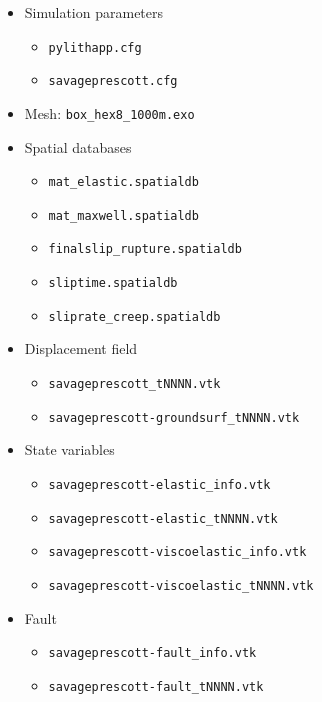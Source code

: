 \documentclass[pdftex,cig,slideColor]{pp4slides}
\begin{document}
{\small
 \hspace*{-0.5in}
  \begin{minipage}[t]{4.5in}
    {}
    \begin{itemize}
    \item Simulation parameters
      \begin{itemize}
      \item {\tt pylithapp.cfg}
      \item {\tt savageprescott.cfg}
      \end{itemize}
    \item Mesh: {\tt box\_hex8\_1000m.exo}
    \item Spatial databases
      \begin{itemize}
      \item {\tt mat\_elastic.spatialdb}
      \item {\tt mat\_maxwell.spatialdb}
      \item {\tt finalslip\_rupture.spatialdb}
      \item {\tt sliptime.spatialdb}
      \item {\tt sliprate\_creep.spatialdb}
      \end{itemize}
    \end{itemize}
  \end{minipage}
  \hfill
  \begin{minipage}[t]{4.75in}
    {}
    \begin{itemize}
   \item Displacement field
      \begin{itemize}
      \item {\tt savageprescott\_tNNNN.vtk}
      \item {\tt savageprescott-groundsurf\_tNNNN.vtk}
      \end{itemize}
    \item State variables
      \begin{itemize}
      \item {\tt savageprescott-elastic\_info.vtk}
      \item {\tt savageprescott-elastic\_tNNNN.vtk}
      \item {\tt savageprescott-viscoelastic\_info.vtk}
      \item {\tt savageprescott-viscoelastic\_tNNNN.vtk}
      \end{itemize}
    \item Fault
      \begin{itemize}
      \item {\tt savageprescott-fault\_info.vtk}
      \item {\tt savageprescott-fault\_tNNNN.vtk}
      \end{itemize}
    \end{itemize}
  \end{minipage}   
}
\end{document}
